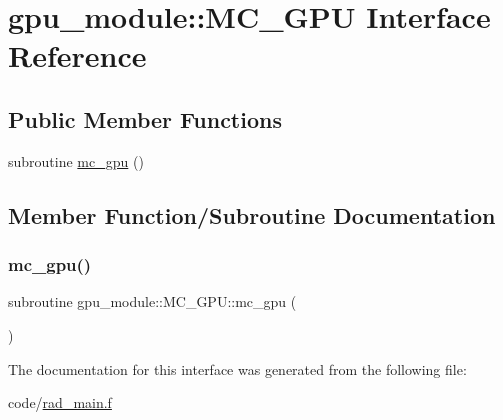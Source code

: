 \hypertarget{interfacegpu__module_1_1MC__GPU}{}\section{gpu\+\_\+module\+:\+:M\+C\+\_\+\+G\+PU Interface Reference}
\label{interfacegpu__module_1_1MC__GPU}
\subsection*{Public Member Functions}
\begin{DoxyCompactItemize}
\item 
subroutine \hyperlink{interfacegpu__module_1_1MC__GPU_af1994bad44f3d1be4ebfbc07da2acdc3}{mc\+\_\+gpu} ()
\end{DoxyCompactItemize}


\subsection{Member Function/\+Subroutine Documentation}
\mbox{\label{interfacegpu__module_1_1MC__GPU_af1994bad44f3d1be4ebfbc07da2acdc3}} 
\subsubsection{\texorpdfstring{mc\+\_\+gpu()}{mc\_gpu()}}
{\footnotesize\ttfamily subroutine gpu\+\_\+module\+::\+M\+C\+\_\+\+G\+P\+U\+::mc\+\_\+gpu (\begin{DoxyParamCaption}{ }\end{DoxyParamCaption})}



The documentation for this interface was generated from the following file\+:\begin{DoxyCompactItemize}
\item 
code/\hyperlink{rad__main_8f}{rad\+\_\+main.\+f}\end{DoxyCompactItemize}

